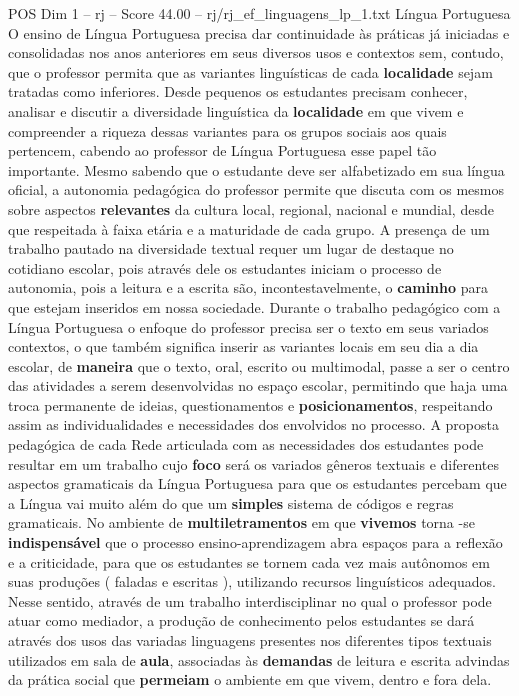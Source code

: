 \begin{textsample}{POS Dim 1 – rj – Score 44.00 – rj/rj\_ef\_linguagens\_lp\_1.txt}  \label{ex:f1_pos_271}
Língua Portuguesa O ensino de Língua Portuguesa precisa dar continuidade às práticas já iniciadas e consolidadas nos anos anteriores em seus diversos usos e contextos sem, contudo, que o professor permita que as variantes linguísticas de cada \textbf{localidade} sejam tratadas como inferiores.
Desde pequenos os estudantes precisam conhecer, analisar e discutir a diversidade linguística da \textbf{localidade} em que vivem e compreender a riqueza dessas variantes para os grupos sociais aos quais pertencem, cabendo ao professor de Língua Portuguesa esse papel tão importante.
Mesmo sabendo que o estudante deve ser alfabetizado em sua língua oficial, a autonomia pedagógica do professor permite que discuta com os mesmos sobre aspectos \textbf{relevantes} da cultura local, regional, nacional e mundial, desde que respeitada à faixa etária e a maturidade de cada grupo.
A presença de um trabalho pautado na diversidade textual requer um lugar de destaque no cotidiano escolar, pois através dele os estudantes iniciam o processo de autonomia, pois a leitura e a escrita são, incontestavelmente, o \textbf{caminho} para que estejam inseridos em nossa sociedade.
Durante o trabalho pedagógico com a Língua Portuguesa o enfoque do professor precisa ser o texto em seus variados contextos, o que também significa inserir as variantes locais em seu dia a dia escolar, de \textbf{maneira} que o texto, oral, escrito ou multimodal, passe a ser o centro das atividades a serem desenvolvidas no espaço escolar, permitindo que haja uma troca permanente de ideias, questionamentos e \textbf{posicionamentos}, respeitando assim as individualidades e necessidades dos envolvidos no processo.
A proposta pedagógica de cada Rede articulada com as necessidades dos estudantes pode resultar em um trabalho cujo \textbf{foco} será os variados gêneros textuais e diferentes aspectos gramaticais da Língua Portuguesa para que os estudantes percebam que a Língua vai muito além do que um \textbf{simples} sistema de códigos e regras gramaticais.
No ambiente de \textbf{multiletramentos} em que \textbf{vivemos} torna -se \textbf{indispensável} que o processo ensino-aprendizagem abra espaços para a reflexão e a criticidade, para que os estudantes se tornem cada vez mais autônomos em suas produções ( faladas e escritas ), utilizando recursos linguísticos adequados.
Nesse sentido, através de um trabalho interdisciplinar no qual o professor pode atuar como mediador, a produção de conhecimento pelos estudantes se dará através dos usos das variadas linguagens presentes nos diferentes tipos textuais utilizados em sala de \textbf{aula}, associadas às \textbf{demandas} de leitura e escrita advindas da prática social que \textbf{permeiam} o ambiente em que vivem, dentro e fora dela.

\end{textsample}
